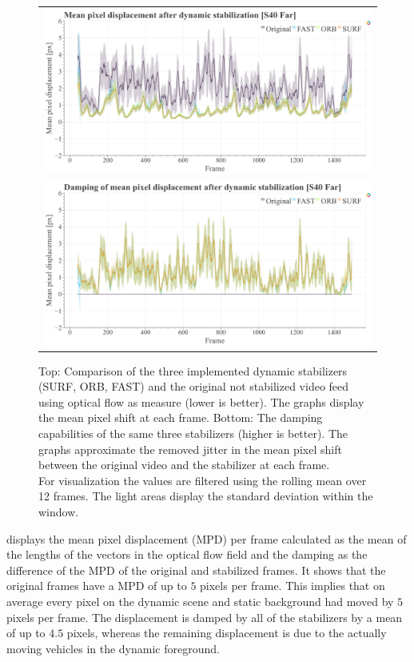 \begin{figure}[t]
    \centering
    \begin{tabular}{c}
      \includegraphics[width=0.9\linewidth]{diagrams/optical_flow/s40_n_far_image_raw.mp4.csv/compare_of_mean_pixel_displacement/window_size_12.html.png}    \\  
      \includegraphics[width=0.9\linewidth]{diagrams/optical_flow/s40_n_far_image_raw.mp4.csv/deltas_of_mean_pixel_displacement/window_size_12.html.png}    
\end{tabular}
    \caption{Top: 
        Comparison of the three implemented dynamic stabilizers (SURF, ORB, FAST) and the original not stabilized video feed using optical flow as measure (lower is better).
        The graphs display the mean pixel shift at each frame. 
        Bottom: 
        The damping capabilities of the same three stabilizers (higher is better). 
        The graphs approximate the removed jitter in the mean pixel shift between the original video and the stabilizer at each frame.\\
        For visualization the values are filtered using the rolling mean over 12 frames. 
        The light areas display the standard deviation within the window.
    }
    \label{fig:dynamic_stabilization_s40_far}
\end{figure}

 displays the mean pixel displacement (MPD) per frame calculated as the mean of the lengths of the vectors in the optical flow field and the damping as the difference of the MPD of the original and stabilized frames.
It shows that the original frames have a MPD of up to $5$ pixels per frame. This implies that on average every pixel on the dynamic scene and static background had moved by $5$ pixels per frame. 
The displacement is damped by all of the stabilizers by a mean of up to $4.5$ pixels, whereas the remaining displacement is due to the actually moving vehicles in the dynamic foreground.   

